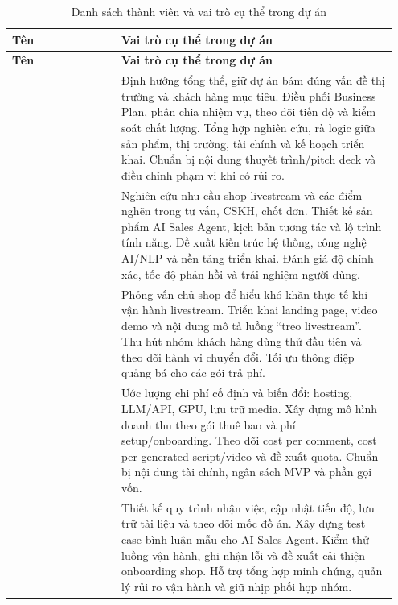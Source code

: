 \begin{longtable}{@{}L{0.27\linewidth}L{0.68\linewidth}@{}}
\caption{Danh sách thành viên và vai trò cụ thể trong dự án}
\label{tab:danh-sach-thanh-vien-vai-tro}\\
\toprule
{}
\textbf{Tên} & \textbf{Vai trò cụ thể trong dự án} \\
\midrule
\endfirsthead

\toprule
{}
\textbf{Tên} & \textbf{Vai trò cụ thể trong dự án} \\
\midrule
\endhead

\bottomrule
\endlastfoot

& 
{Định hướng tổng thể, giữ dự án bám đúng vấn đề thị trường và khách hàng mục tiêu.}
{Điều phối Business Plan, phân chia nhiệm vụ, theo dõi tiến độ và kiểm soát chất lượng.}
{Tổng hợp nghiên cứu, rà logic giữa sản phẩm, thị trường, tài chính và kế hoạch triển khai.}
{Chuẩn bị nội dung thuyết trình/pitch deck và điều chỉnh phạm vi khi có rủi ro.} \\

& 
{Nghiên cứu nhu cầu shop livestream và các điểm nghẽn trong tư vấn, CSKH, chốt đơn.}
{Thiết kế sản phẩm AI Sales Agent, kịch bản tương tác và lộ trình tính năng.}
{Đề xuất kiến trúc hệ thống, công nghệ AI/NLP và nền tảng triển khai.}
{Đánh giá độ chính xác, tốc độ phản hồi và trải nghiệm người dùng.} \\

& 
{Phỏng vấn chủ shop để hiểu khó khăn thực tế khi vận hành livestream.}
{Triển khai landing page, video demo và nội dung mô tả luồng ``treo livestream''.}
{Thu hút nhóm khách hàng dùng thử đầu tiên và theo dõi hành vi chuyển đổi.}
{Tối ưu thông điệp quảng bá cho các gói trả phí.} \\

& 
{Ước lượng chi phí cố định và biến đổi: hosting, LLM/API, GPU, lưu trữ media.}
{Xây dựng mô hình doanh thu theo gói thuê bao và phí setup/onboarding.}
{Theo dõi cost per comment, cost per generated script/video và đề xuất quota.}
{Chuẩn bị nội dung tài chính, ngân sách MVP và phần gọi vốn.} \\

& 
{Thiết kế quy trình nhận việc, cập nhật tiến độ, lưu trữ tài liệu và theo dõi mốc đồ án.}
{Xây dựng test case bình luận mẫu cho AI Sales Agent.}
{Kiểm thử luồng vận hành, ghi nhận lỗi và đề xuất cải thiện onboarding shop.}
{Hỗ trợ tổng hợp minh chứng, quản lý rủi ro vận hành và giữ nhịp phối hợp nhóm.} \\

\end{longtable}
\endgroup
